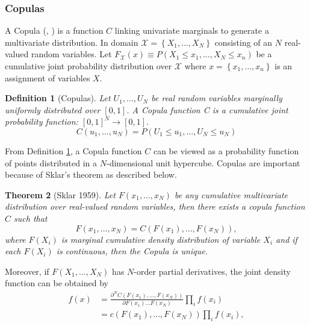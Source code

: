 \documentclass{article}
\newtheorem{theorem}{Theorem}[section]
\newtheorem{definition}[theorem]{Definition}
\begin{document}
\subsubsection{Copulas}
\label{subsubsec:copulas}
A Copula (\cite{Sklar59}, \cite{IntroCopluasBook}) is a function $C$ linking univariate marginals to generate a multivariate distribution. In domain $\mathcal{X}=\left\lbrace X_1,\ldots,X_N \right\rbrace$ consisting of an $N$ real-valued random variables. Let $F_\mathcal{X}(x)\equiv P\left(X_1\leq x_1,\ldots,X_N\leq x_n\right)$ be a cumulative joint probability distribution over $\mathcal{X}$ where $x=\left\lbrace x_1,\ldots,x_n \right\rbrace$ is an assignment of variables $X$. 
\begin{definition}[Copulas]
\label{def:copula}
Let $U_1,\ldots,U_N$ be real random variables marginally uniformly distributed over $\left[0,1\right]$. A Copula function C is a cumulative joint probability function: $\left[0,1\right]^N \rightarrow \left[0,1\right]$.
\[
C\left(u_1,\ldots ,u_N\right)=P\left(U_1\leq u_1,\ldots ,U_N\leq u_N\right)
\]
\end{definition}
From Definition \ref{def:copula}, a Copula function $C$ can be viewed as a probability function of points distributed in a $N$-dimensional unit hypercube. Copulas are important because of Sklar's theorem \cite{Sklar59} as described below.
\begin{theorem}[Sklar 1959]
\label{theo:sklar}
Let $F\left(x_1,\ldots,x_N\right)$ be any cumulative multivariate distribution over real-valued random variables, then there exists a copula function $C$ such that
\[
F\left(x_1,\ldots,x_N\right) = C\left(F\left(x_1\right),\ldots,F\left(x_N\right)\right),
\]
where $F\left(X_i\right)$ is marginal cumulative density distribution
of variable $X_i$ and if each $F\left(X_i\right)$ is continuous, then the Copula is unique.
\end{theorem}
Moreover, if $F\left(X_1,\ldots,X_N\right)$ has $N$-order partial derivatives, the joint density function can be obtained by
\begin{align}
\label{eq:copula_jdf}
f\left(x\right)& =\frac{\partial^N C\left(F\left(x_1\right),\ldots, F\left(x_N\right)\right)}{\partial F\left(x_1\right)\ldots F\left(x_N\right)}\prod_i f\left(x_i\right)\nonumber\\
& =c\left(F\left(x_1\right),\ldots, F\left(x_N\right)\right)\prod_i f\left(x_i\right),
\end{align}		
\end{document}
